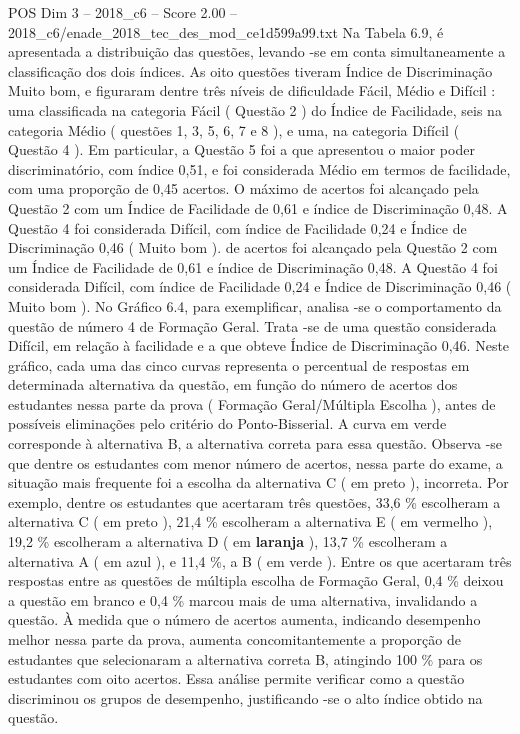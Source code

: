 \begin{textsample}{POS Dim 3 – 2018\_c6 – Score 2.00 – 2018\_c6/enade\_2018\_tec\_des\_mod\_ce1d599a99.txt}
Na Tabela 6.9, é apresentada a distribuição das questões, levando -se em conta simultaneamente a classificação dos dois índices.
As oito questões tiveram Índice de Discriminação Muito bom, e figuraram dentre três níveis de dificuldade Fácil, Médio e Difícil : uma classificada na categoria Fácil ( Questão 2 ) do Índice de Facilidade, seis na categoria Médio ( questões 1, 3, 5, 6, 7 e 8 ), e uma, na categoria Difícil ( Questão 4 ).
Em particular, a Questão 5 foi a que apresentou o maior poder discriminatório, com índice 0,51, e foi considerada Médio em termos de facilidade, com uma proporção de 0,45 acertos.
O máximo de acertos foi alcançado pela Questão 2 com um Índice de Facilidade de 0,61 e índice de Discriminação 0,48.
A Questão 4 foi considerada Difícil, com índice de Facilidade 0,24 e Índice de Discriminação 0,46 ( Muito bom ). de acertos foi alcançado pela Questão 2 com um Índice de Facilidade de 0,61 e índice de Discriminação 0,48.
A Questão 4 foi considerada Difícil, com índice de Facilidade 0,24 e Índice de Discriminação 0,46 ( Muito bom ).
No Gráfico 6.4, para exemplificar, analisa -se o comportamento da questão de número 4 de Formação Geral.
Trata -se de uma questão considerada Difícil, em relação à facilidade e a que obteve Índice de Discriminação 0,46.
Neste gráfico, cada uma das cinco curvas representa o percentual de respostas em determinada alternativa da questão, em função do número de acertos dos estudantes nessa parte da prova ( Formação Geral/Múltipla Escolha ), antes de possíveis eliminações pelo critério do Ponto-Bisserial.
A curva em verde corresponde à alternativa B, a alternativa correta para essa questão.
Observa -se que dentre os estudantes com menor número de acertos, nessa parte do exame, a situação mais frequente foi a escolha da alternativa C ( em preto ), incorreta.
Por exemplo, dentre os estudantes que acertaram três questões, 33,6 \% escolheram a alternativa C ( em preto ), 21,4 \% escolheram a alternativa E ( em vermelho ), 19,2 \% escolheram a alternativa D ( em \textbf{laranja} ), 13,7 \% escolheram a alternativa A ( em azul ), e 11,4 \%, a B ( em verde ).
Entre os que acertaram três respostas entre as questões de múltipla escolha de Formação Geral, 0,4 \% deixou a questão em branco e 0,4 \% marcou mais de uma alternativa, invalidando a questão.
À medida que o número de acertos aumenta, indicando desempenho melhor nessa parte da prova, aumenta concomitantemente a proporção de estudantes que selecionaram a alternativa correta B, atingindo 100 \% para os estudantes com oito acertos.
Essa análise permite verificar como a questão discriminou os grupos de desempenho, justificando -se o alto índice obtido na questão.

\end{textsample}
